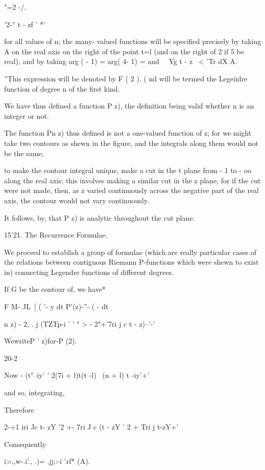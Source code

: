 {"=2 -/.

  '2-'' t - zf ' *'

for all values of n; the many- valued functions will be specified
precisely by taking A on the real axis on the right of the point t=l
(and on the right of 2 if 5 be real), and by taking arg ( - 1) = arg(
4- 1) = and \ \ Yg t - z \ < 'Tr dX A.

''This expression will be denoted by F ( 2 ). ( nd will be termed the
Legeiidre function of degree n of the first kind.

We have thus defined a function P z), the definition being valid
whether n is an integer or not.

The function Pn z) thus defined is not a one-valued function of z;
for we might take two contours as shewn in the figure, and the
integrals along them would not be the same;

to make the contour integral unique, make a cut in the t plane from -
1 to - oo along the real axis; this involves making a similar cut in
the z plane, for if the cut were not made, then, as z varied
continuously across the negative part of the real axis, the contour
would not vary continuously.

It follows, by, that P z) is analytic throughout the cut plane.

15'21. The Recurrence Formulae.

We proceed to establish a group of formulae (which are really
particular cases of the relations between contiguous Riemann
P-functions which were shewn to exist in) connecting Legendre
functions of different degrees.

If G be the contour of, we have*

F M- JL\ [ ( '- y dt P'(z)-''- ( - dt

 n z) - 2, . j (TZTp-i ' ' " > - 2"+'7ri j c t - z)--'-'

WewriteP ' z)for-P (2).

20-2

%
%

Now - (t"--iy' ' 2(7i + l)t(t -l) \ (n + l) t -iy'+'

and so, integrating,

Therefore

2-+1 iri Jc t- zY '2 +- 7ri J c (t - zY ' 2 + Tri j t-zY+'

Consequently

i>,,w-.i'., .)= .jj;:-i 'rf* (A).

}
